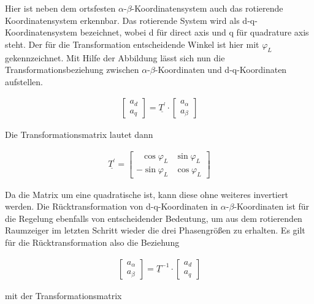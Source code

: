 
Hier ist neben dem ortsfesten $\alpha$-$\beta$-Koordinatensystem auch das rotierende Koordinatensystem erkennbar. 
Das rotierende System wird als d-q-Koordinatensystem bezeichnet, wobei d für direct axis und q für quadrature axis steht.
Der für die Transformation entscheidende Winkel ist hier mit $\varphi_{L}$ gekennzeichnet.
Mit Hilfe der Abbildung lässt sich nun die Transformationsbeziehung zwischen $\alpha$-$\beta$-Koordinaten und d-q-Koordinaten aufstellen.

\begin{align}
	\begin{bmatrix}
		a_{d} \\
		a_{q} 
	\end{bmatrix}
	=\underline{T^\prime}\cdot 
	\begin{bmatrix}
		a_{\alpha} \\
		a_{\beta}
	\end{bmatrix}
	\label{parkvektor}
\end{align}

Die Transformationsmatrix lautet dann

\begin{align}
	\underline{T^\prime} =
	\begin{bmatrix}
		~~~\cos{\varphi_{L}} & \sin{\varphi_{L}} \\
		-\sin{\varphi_{L}} & \cos{\varphi_{L}}
	\end{bmatrix}
	\label{parkmatrix}
\end{align}

Da die Matrix um eine quadratische ist, kann diese ohne weiteres invertiert werden.
Die Rücktransformation von d-q-Koordinaten in $\alpha$-$\beta$-Koordinaten ist für die Regelung ebenfalls von entscheidender Bedeutung, um aus dem rotierenden Raumzeiger im letzten Schritt wieder die drei Phasengrößen zu erhalten. 
Es gilt für die Rücktransformation also die Beziehung

\begin{align}
	\begin{bmatrix}
		a_{\alpha} \\
		a_{\beta}
	\end{bmatrix}
	=\underline{T}^{-1}\cdot 
	\begin{bmatrix}
		a_{d} \\
		a_{q} 
	\end{bmatrix}
	\label{parkvektorinvers}
\end{align}

mit der Transformationsmatrix

